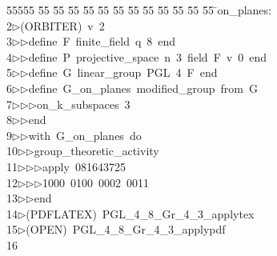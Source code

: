 %
%
\begin{tabbing}
55555 \= 55 \= 55 \= 55 \= 55 \= 55 \= 55 \= 55 \= 55 \= 55 \= 55 \= 55 \= 55 \= \>on\_planes:\\[0pt]
2\>$\triangleright$\>(ORBITER)\ v\ 2\ \\[0pt]
3\>$\triangleright$\>$\triangleright$\>define\ F\ finite\_field\ q\ 8\ end\ \\[0pt]
4\>$\triangleright$\>$\triangleright$\>define\ P\ projective\_space\ n\ 3\ field\ F\ v\ 0\ end\ \\[0pt]
5\>$\triangleright$\>$\triangleright$\>define\ G\ linear\_group\ PGL\ 4\ F\ end\ \\[0pt]
6\>$\triangleright$\>$\triangleright$\>define\ G\_on\_planes\ modified\_group\ from\ G\ \\[0pt]
7\>$\triangleright$\>$\triangleright$\>$\triangleright$\>on\_k\_subspaces\ 3\ \\[0pt]
8\>$\triangleright$\>$\triangleright$\>end\ \\[0pt]
9\>$\triangleright$\>$\triangleright$\>with\ G\_on\_planes\ do\ \\[0pt]
10\>$\triangleright$\>$\triangleright$\>group\_theoretic\_activity\ \\[0pt]
11\>$\triangleright$\>$\triangleright$\>$\triangleright$\>apply\ 081643725\ \\[0pt]
12\>$\triangleright$\>$\triangleright$\>$\triangleright$\>1000\ 0100\ 0002\ 0011\ \\[0pt]
13\>$\triangleright$\>$\triangleright$\>end\\[0pt]
14\>$\triangleright$\>(PDFLATEX)\ PGL\_4\_8\_Gr\_4\_3\_applytex\\[0pt]
15\>$\triangleright$\>(OPEN)\ PGL\_4\_8\_Gr\_4\_3\_applypdf\\[0pt]
16\>\end{tabbing}
